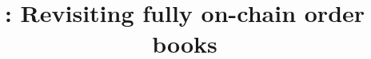 \documentclass[envcountsect]{llncs}
\begin{document}
\frontmatter
\mainmatter

\title{\Large \bf \cm: Revisiting fully on-chain order books}
\author{}



\maketitle











\clearpage



\clearpage
\appendix

\end{document}
